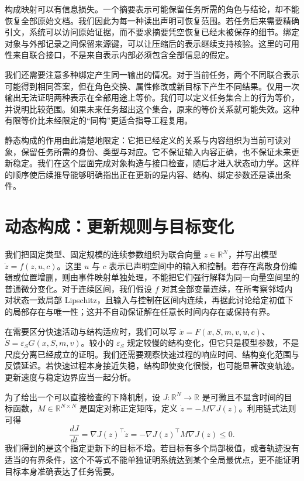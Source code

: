 构成映射可以有信息损失。一个摘要表示可能保留任务所需的角色与结论，却不能恢复全部原始文档。我们因此为每一种读出声明可恢复范围。若任务后来需要精确引文，系统可以访问原始证据，而不要求摘要凭空恢复已经未被保存的细节。绑定对象与外部记录之间保留来源键，可以让压缩后的表示继续支持核验。这里的可用性来自联合接口，不是来自表示内部必须包含全部信息的假定。

我们还需要注意多种绑定产生同一输出的情况。对于当前任务，两个不同联合表示可能得到相同答案，但在角色交换、属性修改或新目标下产生不同结果。仅用一次输出无法证明两种表示在全部用途上等价。我们可以定义任务集合上的行为等价，并说明比较范围。如果未来任务超出这个集合，原来的等价关系就可能失效。这种有限等价比未经限定的“同构”更适合指导工程复用。

静态构成的作用由此清楚地限定：它把已经定义的关系与内容组织为当前可读对象，保留任务所需的身份、类型与对应。它不保证输入内容正确，也不保证未来更新稳定。我们在这个层面完成对象构造与接口检查，随后才进入状态动力学。这样的顺序使后续推导能够明确指出正在更新的是内容、结构、绑定参数还是读出条件。

\section{动态构成：更新规则与目标变化}
\label{sec:dynamic_evolution}

我们把固定类型、固定规模的连续参数组织为联合向量 $z\in\mathbb R^N$，并写出模型 $\dot z=f(z,u,c)$。这里 $u$ 与 $c$ 表示已声明空间中的输入和控制。若存在离散身份编辑或位置增删，则由事件映射单独处理，不能把它们强行解释为同一向量空间里的普通微分变化。对于连续区间，我们假设 $f$ 对其全部变量连续，在所考察邻域内对状态一致局部 Lipschitz，且输入与控制在区间内连续，再据此讨论给定初值下的局部存在与唯一性；这并不自动保证解在任意长时间内存在或保持有界。

在需要区分快速活动与结构适应时，我们可以写 $\dot x=F(x,S,m,v,u,c)$、$\dot S=\varepsilon_SG(x,S,m,v)$。较小的 $\varepsilon_S$ 规定较慢的结构变化，但它只是模型参数，不是尺度分离已经成立的证明。我们还需要观察快速过程的响应时间、结构变化范围与反馈延迟。若快速过程本身接近失稳，结构即使变化很慢，也可能显著改变轨迹。更新速度与稳定边界应当一起分析。

为了给出一个可以直接检查的下降机制，设 $J:\mathbb R^N\to\mathbb R$ 是可微且不显含时间的目标函数，$M\in\mathbb R^{N\times N}$ 是固定对称正定矩阵，定义 $\dot z=-M\nabla J(z)$。利用链式法则可得
\begin{equation}
 \frac{dJ}{dt}=\nabla J(z)^\top\dot z
 =-\nabla J(z)^\top M\nabla J(z)\leq0.
\end{equation}
我们得到的是这个指定更新下的目标不增。若目标有多个局部极值，或者轨迹没有适当的有界条件，这个不等式不能单独证明系统达到某个全局最优点，更不能证明目标本身准确表达了任务需要。

